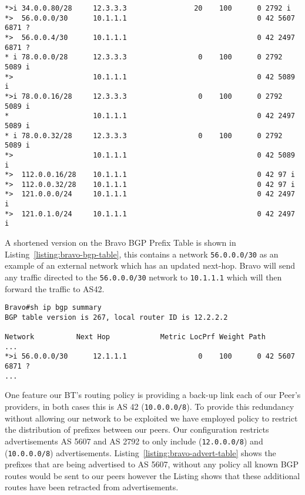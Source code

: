 \begin{lstlisting}[caption={Extract of Alpha BGP Table}, label={listing:bgp-table}]
*>i 34.0.0.80/28     12.3.3.3                20    100      0 2792 i
*>  56.0.0.0/30      10.1.1.1                               0 42 5607 6871 ?
*>  56.0.0.4/30      10.1.1.1                               0 42 2497 6871 ?
* i 78.0.0.0/28      12.3.3.3                 0    100      0 2792 5089 i
*>                   10.1.1.1                               0 42 5089 i
*>i 78.0.0.16/28     12.3.3.3                 0    100      0 2792 5089 i
*                    10.1.1.1                               0 42 2497 5089 i
* i 78.0.0.32/28     12.3.3.3                 0    100      0 2792 5089 i
*>                   10.1.1.1                               0 42 5089 i
*>  112.0.0.16/28    10.1.1.1                               0 42 97 i
*>  112.0.0.32/28    10.1.1.1                               0 42 97 i
*>  121.0.0.0/24     10.1.1.1                               0 42 2497 i
*>  121.0.1.0/24     10.1.1.1                               0 42 2497 i
\end{lstlisting}

A shortened version on the Bravo BGP Prefix Table is shown in Listing~\ref{listing:bravo-bgp-table}, this contains a network \texttt{56.0.0.0/30} as an example of an external network which has an updated next-hop. Bravo will send any traffic directed to the \texttt{56.0.0.0/30} network to \texttt{10.1.1.1} which will then forward the traffic to AS42.

\begin{lstlisting}[caption={Extract of Bravo BGP Table}, label={listing:bravo-bgp-table}]
Bravo#sh ip bgp summary
BGP table version is 267, local router ID is 12.2.2.2

Network          Next Hop            Metric LocPrf Weight Path
...
*>i 56.0.0.0/30      12.1.1.1                 0    100      0 42 5607 6871 ?
...
\end{lstlisting}

One feature our BT's routing policy is providing a back-up link each of our Peer's providers, in both cases this is AS 42 (\texttt{10.0.0.0/8}). To provide this redundancy without allowing our network to be exploited we have employed policy to restrict the distribution of prefixes between our peers. Our configuration restricts advertisements AS 5607 and AS 2792 to only include (\texttt{12.0.0.0/8}) and (\texttt{10.0.0.0/8}) advertisements. Listing~\ref{listing:bravo-advert-table} shows the prefixes that are being advertised to AS 5607, without any policy all known BGP routes would be sent to our peers however the Listing shows that these additional routes have been retracted from advertisements.

